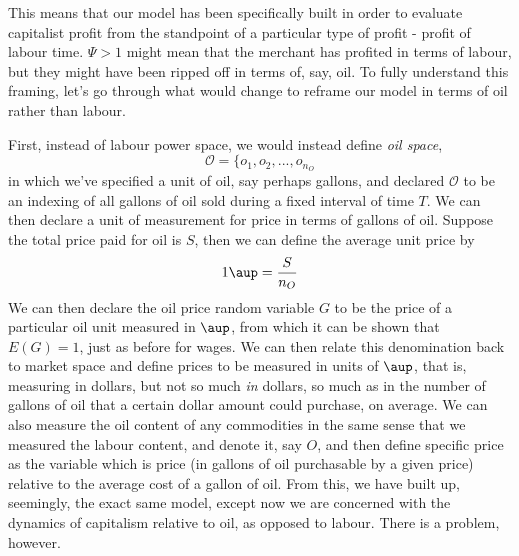 \documentclass{article}
\theoremstyle{definition}
\theoremstyle{plain}
\theoremstyle{theorem}
\begin{document}
This means that our model has been specifically built in order to evaluate capitalist profit from the standpoint of a particular type of profit - profit of labour time. $\Psi > 1$ might mean that the merchant has profited in terms of labour, but they might have been ripped off in terms of, say, oil. To fully understand this framing, let's go through what would change to reframe our model in terms of oil rather than labour. \par 
First, instead of labour power space, we would instead define \textit{oil space}, 
\[ \mathcal{O} = \{o_1,o_2,...,o_{n_O} \]
in which we've specified a unit of oil, say perhaps gallons, and declared $\mathcal{O}$ to be an indexing of all gallons of oil sold during a fixed interval of time $T$. We can then declare a unit of measurement for price in terms of gallons of oil. Suppose the total price paid for oil is $S$, then we can define the average unit price by
\[ 1 \aup = \frac{S}{n_O} \]
We can then declare the oil price random variable $G$ to be the price of a particular oil unit measured in $\aup$, from which it can be shown that $E(G) = 1$, just as before for wages. We can then relate this denomination back to market space and define prices to be measured in units of $\aup$, that is, measuring in dollars, but not so much \textit{in} dollars, so much as in the number of gallons of oil that a certain dollar amount could purchase, on average. We can also measure the oil content of any commodities in the same sense that we measured the labour content, and denote it, say $O$, and then define specific price as the variable which is price (in gallons of oil purchasable by a given price) relative to the average cost of a gallon of oil. From this, we have built up, seemingly, the exact same model, except now we are concerned with the dynamics of capitalism relative to oil, as opposed to labour. There is a problem, however. \par 
\end{document}

